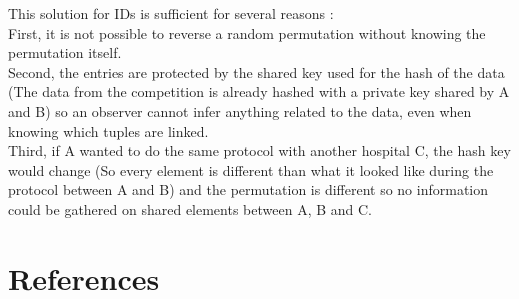 \documentclass{article}
\begin{document}
This solution for IDs is sufficient for several reasons :\\
First, it is not possible to reverse a random permutation without knowing the permutation itself.\\
Second, the entries are protected by the shared key used for the hash of the data (The data from the competition is already hashed with a private key shared by A and B) so an observer cannot infer anything related to the data, even when knowing which tuples are linked.\\
Third, if A wanted to do the same protocol with another hospital C, the hash key would change (So every element is different than what it looked like during the protocol between A and B) and the permutation is different so no information could be gathered on shared elements between A, B and C.

\section{References}


\nocite{*}
\end{document}
